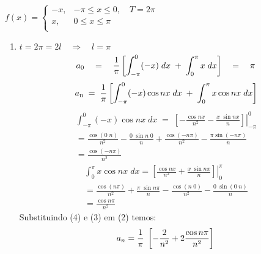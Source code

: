\documentclass[12pt]{article}
\newcommand*\Eval[3]{\left.#1\right\rvert_{#2}^{#3}}
\begin{document}
   \section{ }
    $
    f(x)= 
    \begin{cases}
    -x , & -\pi \leq x \leq 0,\quad T=2\pi\\
    x , & 0 \leq x \leq \pi\\
    \end{cases}
    $
    \begin{enumerate}[label=S.]
    \item 
    $t=2\pi = 2l \quad\Rightarrow\quad l = \pi$
    \begin{equation}
    {a\textsubscript{0}} \quad=\quad \frac{1}{\pi} \left[\int_{-\pi}^{0} (-x) \;dx\;+\; \int_{0}^{\pi} x\; dx\right] \quad=\quad\pi
    \end{equation}
    \begin{equation}
    \begin{split}
    {a\textsubscript{n}} \;=\; \frac{1}{\pi} \left[\int_{-\pi}^{0} (-x) \cos nx \;dx\;+\; \int_{0}^{\pi} x \cos nx\; dx\right] 
    \end{split}
    \end{equation}
    \begin{equation}
    \begin{split}
    \int_{-\pi}^{0} (-x) \cos nx \;dx \; = \; \Eval{\left[ -\frac{\cos nx}{n^{2}} - \frac{x\; \sin nx}{n}\right]}{-\pi}{0} \\
    = \frac{\cos(0\;n)}{n^{2}} - \frac{0\;\sin n\;0}{n} + \frac{\cos (-n\pi)}{n^{2}}-\frac{\pi \sin (-n\pi)}{n}\\
    = \frac{\cos (-n\pi)}{n^{2}}
    \end{split}
    \end{equation}
    \begin{equation}
    \begin{split}
    \int_{0}^{\pi} x \cos nx\; dx = \Eval{\left[\frac{\cos nx}{n^{2}} + \frac{x\; \sin nx}{n}\right]}{0}{\pi} \\
    = \frac{\cos(n\pi)}{n^{2}} + \frac{\pi \;\sin n\pi}{n} - \frac{\cos (n\; 0)}{n^{2}}-\frac{0\; \sin (0\;n)}{n} \\
    = \frac{\cos n\pi}{n^{2}}
    \end{split}
    \end{equation}
    Substituindo (4) e (3) em (2) temos:
    \begin{equation}
    a_{n}= \frac{1}{\pi} \; \left[ -\frac{2}{n^{2}} + 2 \frac{\cos n\pi}{n^{2}}\right] \\

\end{equation}
\end{enumerate}
\end{document}
